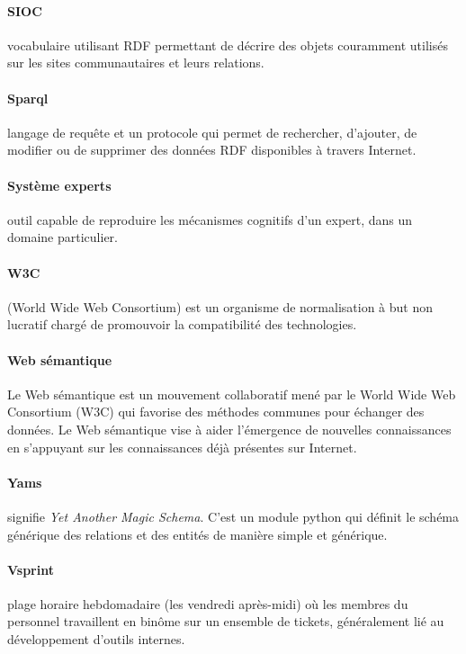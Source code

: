 \documentclass {report}
\begin{document}
\paragraph{SIOC}vocabulaire utilisant RDF permettant de décrire des objets couramment utilisés sur les sites communautaires et leurs relations.
\paragraph{Sparql}langage de requête et un protocole qui permet de rechercher, d'ajouter, de modifier ou de supprimer des données RDF disponibles à travers Internet.
\paragraph{Système experts}outil capable de reproduire les mécanismes cognitifs d'un expert, dans un domaine particulier.
\paragraph{W3C}(World Wide Web Consortium) est un organisme de normalisation à but non lucratif chargé de promouvoir la compatibilité des technologies.
\paragraph{Web sémantique}Le Web sémantique est un mouvement collaboratif mené par le World Wide Web Consortium (W3C) qui favorise des méthodes communes pour échanger des données. Le Web sémantique vise à aider l'émergence de nouvelles connaissances en s'appuyant sur les connaissances déjà présentes sur Internet.
\paragraph{Yams}signifie \textit{Yet Another Magic Schema}. C'est un module python qui définit le schéma générique des relations et des entités de manière simple et générique.
\paragraph{Vsprint}plage horaire hebdomadaire (les vendredi après-midi) où les membres du personnel travaillent en binôme sur un ensemble de tickets, généralement lié au développement d'outils internes.
\end{document}
